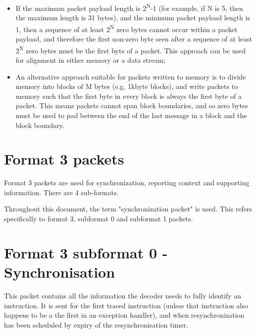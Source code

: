 \begin{itemize}
  \item If the maximum packet payload length is 2\textsuperscript{N}-1 (for example, if N is 5, then the maximum length is
    31 bytes), and the minimum packet payload length is 1, then a sequence of at least 2\textsuperscript{N} zero 
    bytes cannot occur within a packet payload, and therefore the first non-zero byte seen after a sequence of 
    at least 2\textsuperscript{N} zero bytes must be the first byte of a packet.  This approach can be used for
    alignment in either memory or a data stream;
  \item An alternative approach suitable for packets written to memory is to divide memory into blocks of M bytes
    (e.g. 1kbyte blocks), and write packets to memory such that the first byte in every block is always the first
    byte of a packet.  This means packets cannot span block boundaries, and so zero bytes must be used to pad between 
    the end of the last message in a block and the block boundary.
\end{itemize}

\section{Format 3 packets} \label{sec:format3}

Format 3 packets are used for synchronization, reporting context and supporting information.  There are 4
sub-formats.

Throughout this document, the term "synchronization packet" is used.  This refers specifically to format 3, 
subformat 0 and subformat 1 packets.

\section{Format 3 subformat 0 - Synchronisation} \label{sec:format30}

This packet contains all the information the decoder needs to fully identify an instruction.  It is sent for
the first traced instruction (unless that instruction also happens to be a the first in an exception handler), 
and when resynchronization has been scheduled by expiry of the resynchronisation timer.

